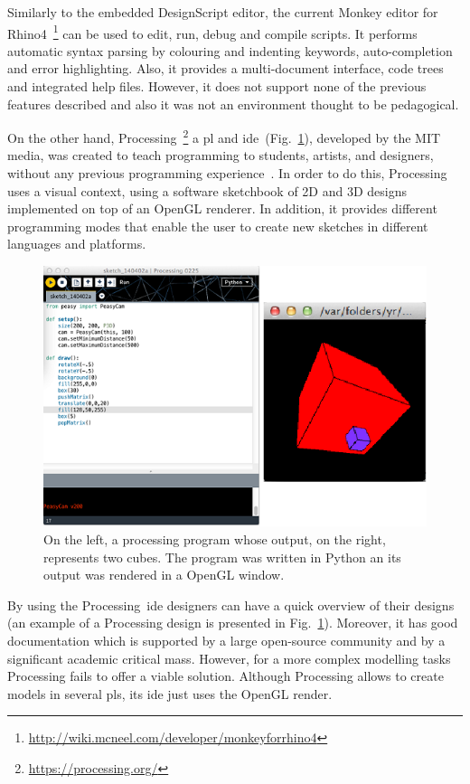 Similarly to the embedded DesignScript editor, the current Monkey editor for Rhino4~\footnote{\url{http://wiki.mcneel.com/developer/monkeyforrhino4}} can be used to edit, run, debug and compile scripts. It performs automatic syntax parsing by colouring and indenting keywords, auto-completion and error highlighting. Also, it provides a multi-document interface, code trees and integrated help files. However, it does not support none of the previous features described and also it was not an environment thought to be pedagogical.

On the other hand, Processing~\footnote{\url{https://processing.org/}} a \ac{pl} and \ac{ide}~(Fig.~\ref{fig:pross}), developed by the {\small MIT} media,  was created to teach programming to students, artists, and designers, without any previous programming experience~\cite{reas2006processing}. In order to do this, Processing uses a visual context, using
a software sketchbook of 2D and 3D designs implemented on top of an OpenGL renderer. In addition, it provides different programming modes that enable the user to create new sketches in different languages and platforms.

\begin{figure}[!htbp]
  \centering
  \includegraphics[scale=0.4]{img/processing}
    \caption{On the left, a processing program whose output, on the right, represents two cubes. The program was written in Python an its output was rendered in a OpenGL window.}
  \label{fig:pross}
\end{figure}

By using the Processing~\ac{ide} designers can have a quick overview of their designs (an example of a Processing design is presented in Fig.~\ref{fig:pross}). Moreover, it has good documentation which is supported by a large open-source community and by a significant academic critical mass. However, for a more complex modelling tasks Processing fails to offer a viable solution. Although Processing allows to create models in several \ac{pl}s, its \ac{ide} just uses the OpenGL render.   

